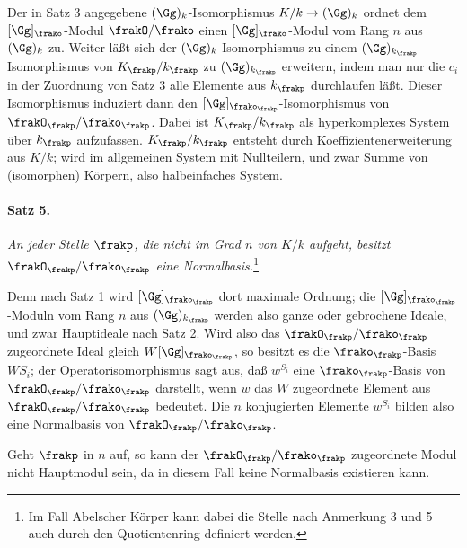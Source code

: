 Der in Satz 3 angegebene \((\Gg)_k\)-Isomorphismus \(K/k\to(\Gg)_k\) ordnet dem \([\Gg]_\frako\)-Modul \(\frakO/\frako\) einen \([\Gg]_\frako\)-Modul vom Rang \(n\) aus \((\Gg)_k\) zu. Weiter läßt sich der \((\Gg)_k\)-Isomorphismus zu einem \((\Gg)_{k_\frakp}\)-Isomorphismus von \(K_\frakp/k_\frakp\) zu \((\Gg)_{k_\frakp}\) erweitern, indem man nur die \(c_i\) in der Zuordnung von Satz 3 alle Elemente aus \(k_\frakp\) durchlaufen läßt. Dieser Isomorphismus induziert dann den \([\Gg]_{\frako_\frakp}\)-Isomorphismus von \(\frakO_\frakp/\frako_\frakp\). Dabei ist \(K_\frakp/k_\frakp\) als hyperkomplexes System über \(k_\frakp\) aufzufassen. \(K_\frakp/k_\frakp\) entsteht durch Koeffizientenerweiterung aus \(K/k\); wird im allgemeinen System mit Nullteilern, und zwar Summe von (isomorphen) Körpern, also halbeinfaches System.

\paragraph{Satz 5.}
\emph{An jeder Stelle \(\frakp\), die nicht im Grad \(n\) von \(K/k\) aufgeht, besitzt \(\frakO_\frakp/\frako_\frakp\) eine Normalbasis.}\footnote{Im Fall Abelscher Körper kann dabei die Stelle nach Anmerkung 3 und 5 auch durch den Quotientenring definiert werden.}

Denn nach Satz 1 wird \([\Gg]_{\frako_\frakp}\) dort maximale Ordnung; die \([\Gg]_{\frako_\frakp}\)-Moduln vom Rang \(n\) aus \((\Gg)_{k_\frakp}\) werden also ganze oder gebrochene Ideale, und zwar Hauptideale nach Satz 2. Wird also das \(\frakO_\frakp/\frako_\frakp\) zugeordnete Ideal gleich \(W[\Gg]_{\frako_\frakp}\), so besitzt es die \(\frako_\frakp\)-Basis \(WS_i\); der Operatorisomorphismus sagt aus, daß \(w^{S_i}\) eine \(\frako_\frakp\)-Basis von \(\frakO_\frakp/\frako_\frakp\) darstellt, wenn \(w\) das \(W\) zugeordnete Element aus \(\frakO_\frakp/\frako_\frakp\) bedeutet. Die \(n\) konjugierten Elemente \(w^{S_i}\) bilden also eine Normalbasis von \(\frakO_\frakp/\frako_\frakp\).

Geht \(\frakp\) in \(n\) auf, so kann der \(\frakO_\frakp/\frako_\frakp\) zugeordnete Modul nicht Hauptmodul sein, da in diesem Fall keine Normalbasis existieren kann.

